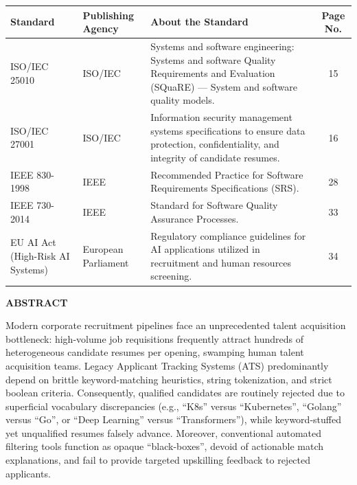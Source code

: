 \documentclass[12pt,a4paper]{report}
\begin{document}
\begin{table}[h!]
\centering
\begin{tabular}{|p{3cm}|p{2.5cm}|p{7.5cm}|c|}
\hline
\textbf{Standard} & \textbf{Publishing Agency} & \textbf{About the Standard} & \textbf{Page No.} \\ \hline
ISO/IEC 25010 & ISO/IEC & Systems and software engineering: Systems and software Quality Requirements and Evaluation (SQuaRE) — System and software quality models. & 15 \\ \hline
ISO/IEC 27001 & ISO/IEC & Information security management systems specifications to ensure data protection, confidentiality, and integrity of candidate resumes. & 16 \\ \hline
IEEE 830-1998 & IEEE & Recommended Practice for Software Requirements Specifications (SRS). & 28 \\ \hline
IEEE 730-2014 & IEEE & Standard for Software Quality Assurance Processes. & 33 \\ \hline
EU AI Act (High-Risk AI Systems) & European Parliament & Regulatory compliance guidelines for AI applications utilized in recruitment and human resources screening. & 34 \\ \hline
\end{tabular}
\end{table}

\newpage
{}
\begin{center}
    {\Large \textbf{ABSTRACT}}
\end{center}
\vspace{0.8cm}

Modern corporate recruitment pipelines face an unprecedented talent acquisition bottleneck: high-volume job requisitions frequently attract hundreds of heterogeneous candidate resumes per opening, swamping human talent acquisition teams. Legacy Applicant Tracking Systems (ATS) predominantly depend on brittle keyword-matching heuristics, string tokenization, and strict boolean criteria. Consequently, qualified candidates are routinely rejected due to superficial vocabulary discrepancies (e.g., ``K8s'' versus ``Kubernetes'', ``Golang'' versus ``Go'', or ``Deep Learning'' versus ``Transformers''), while keyword-stuffed yet unqualified resumes falsely advance. Moreover, conventional automated filtering tools function as opaque ``black-boxes'', devoid of actionable match explanations, and fail to provide targeted upskilling feedback to rejected applicants.
\end{document}
